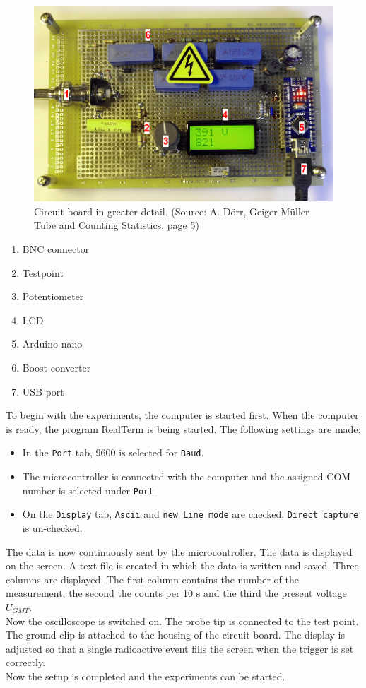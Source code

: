 \begin{figure}[H]
	\begin{center}
		\includegraphics[width=14cm]{circuit_board.png}
		\caption{Circuit board in greater detail. (Source: A. Dörr, Geiger-Müller Tube and Counting Statistics, page 5)}  
		\label{fig:circuit_board} 
	\end{center}
\end{figure}
%
\begin{enumerate}
	\item BNC connector
	\item Testpoint
	\item Potentiometer
	\item LCD
	\item Arduino nano
	\item Boost converter
	\item USB port
\end{enumerate}
%
To begin with the experiments, the computer is started first. When the computer is ready, the program RealTerm is being started. The following settings are made:
\begin{itemize}
	\item In the \texttt{Port} tab, 9600 is selected for \texttt{Baud}.
	\item The microcontroller is connected with the computer and the assigned COM number is selected under \texttt{Port}.
	\item On the \texttt{Display} tab, \texttt{Ascii} and \texttt{new Line mode} are checked, \texttt{Direct capture} is un-checked.
\end{itemize}
%
The data is now continuously sent by the microcontroller. The data is displayed on the screen. A text file is created in which the data is written and saved. Three columns are displayed. The first column contains the number of the measurement, the second the counts per 10 s and the third the present voltage $U_{GMT}$.\\
Now the oscilloscope is switched on. The probe tip is connected to the test point. The ground clip is attached to the housing of the circuit board. The display is adjusted so that a single radioactive event fills the screen when the trigger is set correctly.\\
Now the setup is completed and the experiments can be started.
